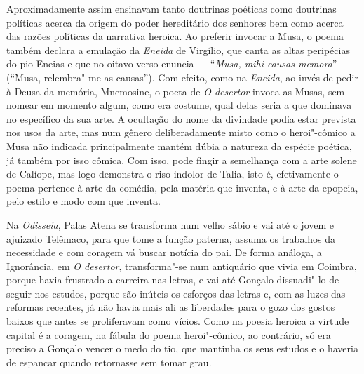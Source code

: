 Aproximadamente assim ensinavam tanto doutrinas poéticas como doutrinas
políticas acerca da origem do poder hereditário dos senhores bem como acerca das
razões políticas da narrativa heroica.  Ao preferir invocar a Musa, o poema
também declara a emulação da \textit{Eneida} de Virgílio, que canta as altas
peripécias do pio Eneias e que no oitavo verso enuncia --- ``\textit{Musa, mihi
causas memora}'' (``Musa, relembra"-me as causas''). Com efeito, como na
\textit{Eneida}, ao invés de pedir à Deusa da memória, Mnemosine, o poeta de
\textit{O desertor} invoca as Musas, sem nomear em momento algum, como era
costume, qual delas seria a que dominava no específico da sua arte. A ocultação
do nome da divindade podia estar prevista nos usos da arte, mas num gênero  deliberadamente misto como o heroi"-cômico a Musa não indicada
principalmente mantém dúbia a natureza da espécie poética, já
também por isso cômica. Com isso, pode fingir a semelhança com a arte solene de
Calíope, mas logo demonstra o riso indolor de Talia, isto é, efetivamente o
poema pertence à arte da comédia, pela matéria que inventa, e à arte da epopeia,
pelo estilo e modo com que inventa.


Na \textit{Odisseia}, Palas Atena se transforma num velho sábio e vai até o
jovem e ajuizado Telêmaco, para que tome a função paterna, assuma os trabalhos
da necessidade e com coragem vá buscar notícia do pai. De forma análoga, a
Ignorância, em \textit{O desertor}, transforma"-se num antiquário que vivia em
Coimbra, porque havia frustrado a carreira nas letras, e vai até Gonçalo
dissuadi"-lo de seguir nos estudos, porque são inúteis os esforços das letras e,
com as luzes das reformas recentes, já não havia mais ali as liberdades para o
gozo dos gostos baixos que antes se proliferavam como vícios.  Como na poesia
heroica a virtude capital é a coragem, na fábula do poema heroi"-cômico, ao
contrário, só era preciso a Gonçalo vencer o medo do tio, que mantinha os seus
estudos e o haveria de espancar quando retornasse sem tomar grau.

